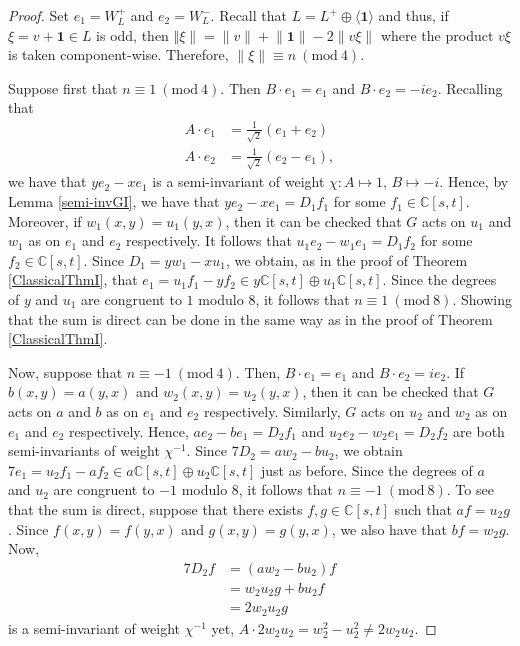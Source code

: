 \documentclass[a4paper,reqno]{amsart}
\theoremstyle{definition}
\theoremstyle{remark} \newtheorem{remark}[theorem]{Remark}
\numberwithin{equation}{section}
\begin{document}
\begin{proof}
    Set \(e_1 = W_L^+\) and \(e_2 = W_L^-\). Recall that \(L = L^+ \oplus \langle \textbf{1} \rangle\) and thus, if \(\xi = v + \textbf{1} \in L\) is odd, then \(\Vert \xi \rVert = \lVert v \rVert + \lVert \textbf{1} \rVert - 2\lVert v\xi \rVert\) where the product \(v\xi\) is taken component-wise. Therefore, \(\lVert \xi \rVert \equiv n \ (\textrm{mod}\ 4)\). 
    
    Suppose first that \(n\equiv 1 \ (\textrm{mod}\ 4)\). Then \(B \cdot e_1 = e_1\) and \(B \cdot e_2 = -ie_2\). Recalling that 
    \begin{align*}
        A \cdot e_1 &= \frac{1}{\sqrt{2}}(e_1 + e_2) \\
        A \cdot e_2 &= \frac{1}{\sqrt{2}}(e_2 - e_1),
    \end{align*}
    we have that \(ye_2 - xe_1\) is a semi-invariant of weight \(\chi: A\mapsto 1,\, B\mapsto -i\). Hence, by Lemma \ref{semi-invGI}, we have that \(ye_2 - xe_1 = D_1f_1\) for some \(f_1 \in \mathbb{C}[s,t]\). Moreover, if \(w_1(x,y) = u_1(y,x)\), then it can be checked that \(G\) acts on \(u_1\) and \(w_1\) as on \(e_1\) and \(e_2\) respectively. It follows that \(u_1e_2 - w_1e_1 = D_1f_2\) for some \(f_2 \in \mathbb{C}[s,t]\). Since \(D_1 = yw_1 - xu_1\), we obtain, as in the proof of Theorem \ref{ClassicalThmI}, that \(e_1 = u_1f_1 - yf_2 \in y\mathbb{C}[s,t] \oplus u_1\mathbb{C}[s,t]\). Since the degrees of \(y\) and \(u_1\) are congruent to \(1\) modulo \(8\), it follows that \(n \equiv 1 \ (\textrm{mod}\ 8)\). Showing that the sum is direct can be done in the same way as in the proof of Theorem \ref{ClassicalThmI}.

    Now, suppose that \(n \equiv -1 \ (\textrm{mod}\ 4)\). Then, \(B \cdot e_1 = e_1\) and \(B \cdot e_2 = ie_2\). If \(b(x,y) = a(y,x)\) and \(w_2(x,y) = u_2(y,x)\), then it can be checked that \(G\) acts on \(a\) and \(b\) as on \(e_1\) and \(e_2\) respectively. Similarly, \(G\) acts on \(u_2\) and \(w_2\) as on \(e_1\) and \(e_2\) respectively. Hence, \(ae_2 - be_1 = D_2f_1\) and \(u_2e_2 - w_2e_1 = D_2f_2\) are both semi-invariants of weight \(\chi^{-1}\). Since \(7D_2 = aw_2 - bu_2\), we obtain \(7e_1 = u_2f_1 - af_2 \in a\mathbb{C}[s,t] \oplus u_2 \mathbb{C}[s,t]\) just as before. Since the degrees of \(a\) and \(u_2\) are congruent to \(-1\) modulo \(8\), it follows that \(n \equiv -1 \ (\textrm{mod}\ 8)\). To see that the sum is direct, suppose that there exists \(f,g \in \mathbb{C}[s,t]\) such that \(af = u_2g\). Since \(f(x,y) = f(y,x)\) and \(g(x,y) = g(y,x)\), we also have that \(bf = w_2g\). Now, 
    \begin{align*}
        7D_2f &= (aw_2 - bu_2)f \\
        &= w_2u_2g + bu_2f \\
        &= 2w_2u_2g
    \end{align*}
    is a semi-invariant of weight \(\chi^{-1}\) yet, \(A \cdot 2w_2u_2 = w_2^2 - u_2^2 \neq 2w_2u_2\).
\end{proof}
\end{document}

